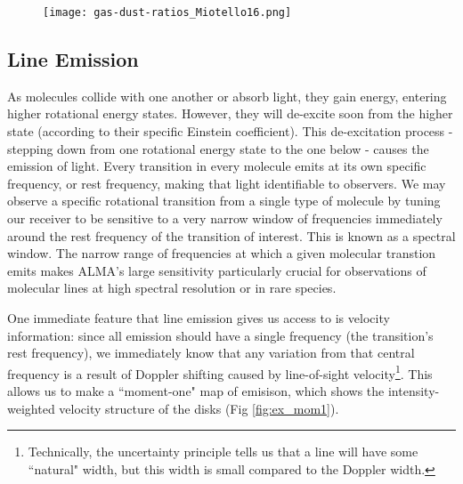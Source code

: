 \begin{figure}
\centering
  \texttt{[image: gas-dust-ratios\_Miotello16.png]}
  \label{fig:gas-dust-ratios}
\end{figure}







\subsection{Line Emission}

As molecules collide with one another or absorb light, they gain energy, entering higher rotational energy states. However, they will de-excite soon from the higher state (according to their specific Einstein coefficient). This de-excitation process - stepping down from one rotational energy state to the one below - causes the emission of light. Every transition in every molecule emits at its own specific frequency, or rest frequency, making that light identifiable to observers. We may observe a specific rotational transition from a single type of molecule by tuning our receiver to be sensitive to a very narrow window of frequencies immediately around the rest frequency of the transition of interest. This is known as a spectral window. The narrow range of frequencies at which a given molecular transtion emits makes ALMA's large sensitivity particularly crucial for observations of molecular lines at high spectral resolution or in rare species.

One immediate feature that line emission gives us access to is velocity information: since all emission should have a single frequency (the transition's rest frequency), we immediately know that any variation from that central frequency is a result of Doppler shifting caused by line-of-sight velocity\footnote{Technically, the uncertainty principle tells us that a line will have some ``natural" width, but this width is small compared to the Doppler width.}. This allows us to make a ``moment-one" map of emisison, which shows the intensity-weighted velocity structure of the disks (Fig \ref{fig:ex_mom1}).


